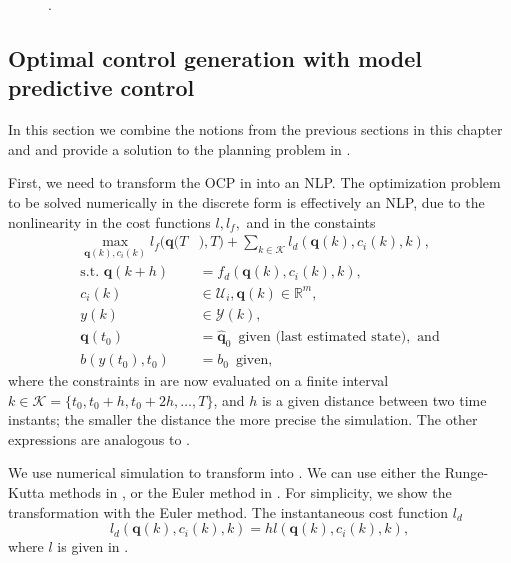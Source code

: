\begin{figure}[h]
  \centering
  \selectfont
  
  \caption[.]{.}
  \label{fig:plot-7}
\end{figure}

\subsection{Optimal control generation with model predictive control}
\label{sec:opt-cont-gener}

In this section we combine the notions from the previous sections in this chapter and  and provide a solution to the planning problem in .

First, we need to transform the OCP in  into an NLP. The optimization problem to be solved numerically in the discrete form is effectively an NLP, due to the nonlinearity in the cost functions $l,l_f,$ and in the constaints
\begin{subequations}\label{eq:disc-ocp-output-mpc}\begin{align}
  \max_{\mathbf{q}(k),c_i(k)}{l_f(\mathbf{q}(T}&{),T)+\sum_{k\in\mathcal{K}}{l_d(\mathbf{q}(k),c_i(k),k)}},\\
  \text{s.t. }\mathbf{q}(k+h)&=f_d(\mathbf{q}(k),c_i(k),k),\label{eq:disc-dyn-evol}\\
  c_i(k)&\in\mathcal{U}_i,\mathbf{q}(k)\in\mathbb{R}^m,\label{eq:disc-state-cont-const-mpc}\\
  y(k)&\in\mathcal{Y}(k),\label{eq:disc-batt-const-mpc}\\
  \mathbf{q}(t_0)&=\hat{\mathbf{q}}_0\,\,\,\text{given (last estimated state)},\text{ and}\\
  b(y(t_0),t_0)&=b_0\,\,\,\text{given},
\end{align}\end{subequations}
where the constraints in  are now evaluated on a finite interval $k\in\mathcal{K}=\{t_0,t_0+h,t_0+2h,\dots,T\}$, and $h$ is a given distance between two time instants; the smaller the distance the more precise the simulation. The other expressions are analogous to .

We use numerical simulation to transform  into . We can use either the Runge-Kutta methods in , or the Euler method in . For simplicity, we show the transformation with the Euler method. The instantaneous cost function $l_d$
\begin{equation}
  l_d(\mathbf{q}(k),c_i(k),k)=hl(\mathbf{q}(k),c_i(k),k),
\end{equation}
where $l$ is given in .

